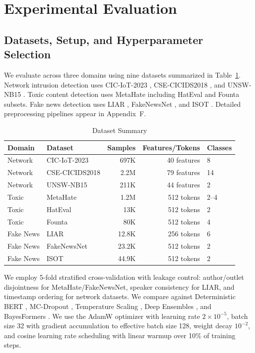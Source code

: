\documentclass[12pt,a4paper]{article}
\theoremstyle{definition}
\begin{document}
\section{Experimental Evaluation}

\subsection{Datasets, Setup, and Hyperparameter Selection}

We evaluate across three domains using nine datasets summarized in Table~\ref{tab:datasets}. Network intrusion detection uses CIC-IoT-2023 \citep{neto2023ciciot2023}, CSE-CICIDS2018 \citep{sharafaldin2018toward}, and UNSW-NB15 \citep{moustafa2015unsw}. Toxic content detection uses MetaHate \citep{kirk2024metahate} including HatEval \citep{basile2019semeval} and Founta \citep{founta2018large} subsets. Fake news detection uses LIAR \citep{wang2017liar}, FakeNewsNet \citep{shu2020fakenewsnet}, and ISOT \citep{ahmed2018detecting}. Detailed preprocessing pipelines appear in Appendix~F.

\begin{table}[t]
\caption{Dataset Summary}
\label{tab:datasets}
\centering
\small
\setlength{\tabcolsep}{3pt}
\begin{tabular}{@{}llrrl@{}}
\toprule
Domain & Dataset & Samples & Features/Tokens & Classes\\
\midrule
Network & CIC-IoT-2023 & 697K & 40 features & 8 \\
Network & CSE-CICIDS2018 & 2.2M & 79 features & 14 \\
Network & UNSW-NB15 & 211K & 44 features & 2 \\
Toxic & MetaHate & 1.2M & 512 tokens & 2--4 \\
Toxic & HatEval & 13K & 512 tokens & 2 \\
Toxic & Founta & 80K & 512 tokens & 4 \\
Fake News & LIAR & 12.8K & 256 tokens & 6 \\
Fake News & FakeNewsNet & 23.2K & 512 tokens & 2 \\
Fake News & ISOT & 44.9K & 512 tokens & 2 \\
\bottomrule
\end{tabular}
\end{table}

We employ 5-fold stratified cross-validation with leakage control: author/outlet disjointness for MetaHate/FakeNewsNet, speaker consistency for LIAR, and timestamp ordering for network datasets. We compare against Deterministic BERT \citep{devlin2019bert}, MC-Dropout \citep{gal2016dropout}, Temperature Scaling \citep{guo2017calibration}, Deep Ensembles \citep{lakshminarayanan2017simple}, and BayesFormers \citep{sankararaman2022bayesformer}. We use the AdamW optimizer \citep{loshchilov2019decoupled} with learning rate $2\times 10^{-5}$, batch size 32 with gradient accumulation to effective batch size 128, weight decay $10^{-2}$, and cosine learning rate scheduling with linear warmup over 10\% of training steps.
\end{document}
